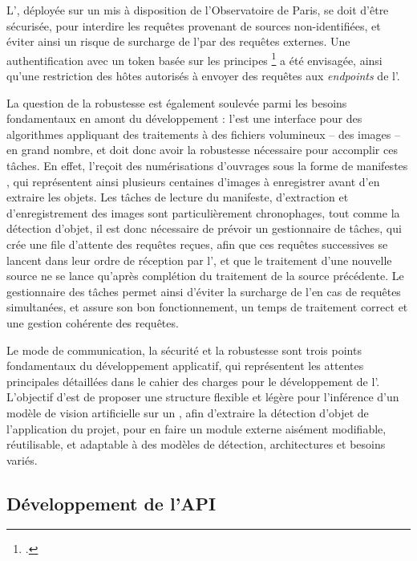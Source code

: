     L'\api, déployée sur un \gpu mis à disposition de l'Observatoire de Paris, se doit d'être sécurisée, pour interdire les requêtes provenant de sources non-identifiées, et éviter ainsi un risque de surcharge de l'\api par des requêtes externes. Une authentification avec un token basée sur les principes \rest\footcite{grinbergRESTfulAuthenticationFlask} a été envisagée, ainsi qu'une restriction des hôtes autorisés à envoyer des requêtes aux \textit{endpoints} de l'\api.
    
    La question de la robustesse est également soulevée parmi les besoins fondamentaux en amont du développement : l'\api est une interface pour des algorithmes appliquant des traitements à des fichiers volumineux -- des images -- en grand nombre, et doit donc avoir la robustesse nécessaire pour accomplir ces tâches. En effet, l'\api reçoit des numérisations d'ouvrages sous la forme de manifestes \iiif, qui représentent ainsi plusieurs centaines d'images à enregistrer avant d'en extraire les objets. Les tâches de lecture du manifeste, d'extraction et d'enregistrement des images sont particulièrement chronophages, tout comme la détection d'objet, il est donc nécessaire de prévoir un gestionnaire de tâches, qui crée une file d'attente des requêtes reçues, afin que ces requêtes successives se lancent dans leur ordre de réception par l'\api, et que le traitement d'une nouvelle source ne se lance qu'après complétion du traitement de la source précédente. Le gestionnaire des tâches permet ainsi d'éviter la surcharge de l'\api en cas de requêtes simultanées, et assure son bon fonctionnement, un temps de traitement correct et une gestion cohérente des requêtes.
    
    Le mode de communication, la sécurité et la robustesse sont trois points fondamentaux du développement applicatif, qui représentent les attentes principales détaillées dans le cahier des charges pour le développement de l'\api. L'objectif d'\exapi est de proposer une structure flexible et légère pour l'inférence d'un modèle de vision artificielle sur un \gpu, afin d'extraire la détection d'objet de l'application du projet, pour en faire un module externe aisément modifiable, réutilisable, et adaptable à des modèles de détection, architectures et besoins variés.
	
\subsection{Développement de l'API}
